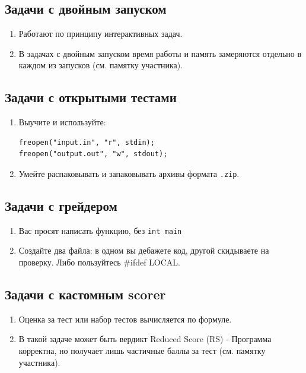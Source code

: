 \documentclass[12pt,a4paper]{article}
\begin{document}
\subsection*{Задачи с двойным запуском}

\begin{enumerate}
    \item Работают по принципу интерактивных задач.
    \item В задачах с двойным запуском время работы и память замеряются отдельно в каждом из запусков (см. памятку участника).
\end{enumerate}

\subsection*{Задачи с открытыми тестами}

\begin{enumerate}
    \item Выучите и используйте:
    \begin{verbatim}
freopen("input.in", "r", stdin);
freopen("output.out", "w", stdout);
    \end{verbatim}
    \item Умейте распаковывать и запаковывать архивы формата \texttt{.zip}.
\end{enumerate}

\subsection*{Задачи с грейдером}

\begin{enumerate}
    \item Вас просят написать функцию, без \texttt{int main}
    \item Создайте два файла: в одном вы дебажете код, другой скидываете на проверку. Либо пользуйтесь $\#$ifdef LOCAL.
\end{enumerate}

\subsection*{Задачи с кастомным scorer}

\begin{enumerate}
    \item Оценка за тест или набор тестов вычисляется по формуле.
    \item В такой задаче может быть вердикт Reduced Score (RS) - Программа корректна, но получает лишь частичные баллы за тест (см. памятку участника).
\end{enumerate}
\end{document}
